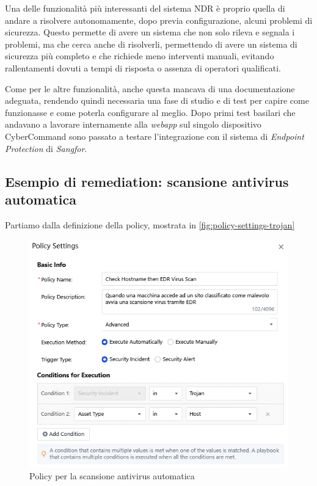 Una delle funzionalità più interessanti del sistema NDR è proprio quella di andare a risolvere autonomamente, dopo previa configurazione, alcuni problemi di sicurezza. Questo permette di avere un sistema che non solo rileva e segnala i problemi, ma che cerca anche di risolverli, permettendo di avere un sistema di sicurezza più completo e che richiede meno interventi manuali, evitando rallentamenti dovuti a tempi di risposta o assenza di operatori qualificati.

Come per le altre funzionalità, anche questa mancava di una documentazione adeguata, rendendo quindi necessaria una fase di studio e di test per capire come funzionasse e come poterla configurare al meglio. Dopo primi test basilari che andavano a lavorare internamente alla \emph{webapp} sul singolo dispositivo CyberCommand\cite{sangfor:policy-training} sono passato a testare l'integrazione con il sistema di \emph{Endpoint Protection} di \emph{Sangfor}\cite{sangfor:policy-edr-integration}.

\subsection{Esempio di remediation: scansione antivirus automatica}

Partiamo dalla definizione della policy, mostrata in \autoref{fig:policy-settings-trojan}

\begin{figure}[!htbp]
    \centering
    \includegraphics[scale=0.7]{images/ndr/policy-settings-trojan.png}
    \caption{Policy per la scansione antivirus automatica}
    \label{fig:policy-settings-trojan}
\end{figure}


